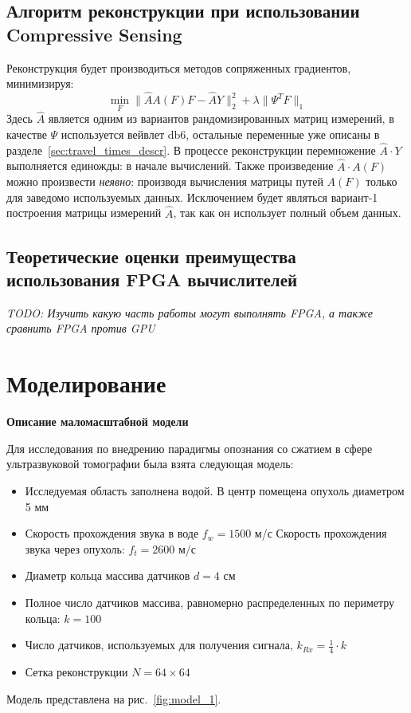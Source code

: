 \documentclass[14pt]{matmex-diploma}
\begin{document}
\subsection{Алгоритм реконструкции при использовании Compressive Sensing}
Реконструкция будет производиться методов сопряженных градиентов, минимизируя:
\begin{equation}
\label{eq:conj_cs}
\min_F \| \hat{A} A(F) F - \hat{A}Y \|_2^2 + \lambda \| \Psi^T F \|_1
\end{equation}
Здесь $\hat{A}$ является одним из вариантов рандомизированных матриц измерений, в качестве $\Psi$ используется вейвлет db6, остальные переменные уже описаны в разделе~\ref{sec:travel_times_descr}. В процессе реконструкции перемножение $\hat{A}\cdot Y$ выполняется единожды: в начале вычислений. Также произведение $\hat{A} \cdot A(F)$ можно произвести \textit{неявно}: производя вычисления матрицы путей $A(F)$ только для заведомо используемых данных. Исключением будет являться вариант-1 построения матрицы измерений $\hat{A}$, так как он использует полный объем данных.


\subsection{Теоретические оценки преимущества использования FPGA вычислителей}
\textit{TODO: Изучить какую часть работы могут выполнять FPGA, а также сравнить FPGA против GPU} \\


\section{Моделирование} \label{sec:modeling}

\textbf{Описание маломасштабной модели} \label{sec:model_desc}

Для исследования по внедрению парадигмы опознания со сжатием в сфере ультразвуковой томографии была взята следующая модель:
\begin{itemize}
\item Исследуемая область заполнена водой. В центр помещена опухоль диаметром 5 мм
\item Скорость прохождения звука в воде $f_w = 1500$ м/с Скорость прохождения звука через опухоль: $f_t = 2600$ м/с
\item Диаметр кольца массива датчиков $d = 4 \text{ см}$
\item Полное число датчиков массива, равномерно распределенных по периметру кольца: $k = 100$
\item Число датчиков, используемых для получения сигнала, $k_{Rx} = \frac{1}{4} \cdot k$
\item Сетка реконструкции $N = 64\times 64$
\end{itemize}
Модель представлена на рис.~\ref{fig:model_1}.
\end{document}
